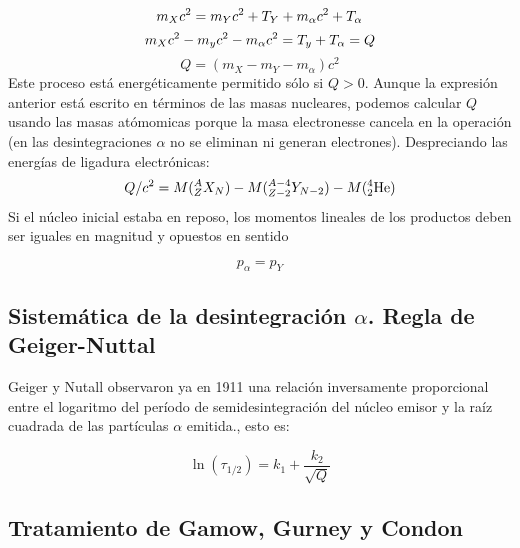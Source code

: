 \begin{equation}
    m_X c^2 = m_Y c^2 + T_Y + m_\alpha c^2 + T_\alpha \\
\end{equation}    
\begin{equation}
    m_X c^2 - m_y c^2 - m_\alpha  c^2  = T_y + T_\alpha = Q \\
\end{equation}    
\begin{equation}
    Q = (m_X - m_Y - m_\alpha)c^2
\end{equation}    
Este proceso está energéticamente permitido sólo si $Q>0$. Aunque la expresión anterior está escrito en términos de las masas nucleares, podemos calcular $Q$ usando las masas atómomicas porque la masa electronesse cancela en la operación (en las desintegraciones $\alpha$ no se eliminan ni generan electrones). Despreciando las energías de ligadura electrónicas:
\begin{eqnarray}
Q/c^2 = M(^A_Z X_N) - M(^{A-4}_{Z-2}Y_{N-2}) - M(^4_2\text{He})
\end{eqnarray}
Si el núcleo inicial estaba en reposo, los momentos lineales de los productos deben ser iguales en magnitud y opuestos en sentido

\begin{equation}
    p_\alpha = p_Y
\end{equation}

\Revisar

\subsection{Sistemática de la desintegración $\alpha$. Regla de Geiger-Nuttal}

Geiger y Nutall observaron ya en 1911 una relación inversamente proporcional entre el logaritmo del período de semidesintegración del núcleo emisor y la raíz cuadrada de las partículas $\alpha$ emitida., esto es:

\begin{equation}
\ln (\tau_{1/2}) = k_1 + \frac{k_2}{\sqrt{Q}}
\end{equation}

\subsection{Tratamiento de Gamow, Gurney y Condon}

